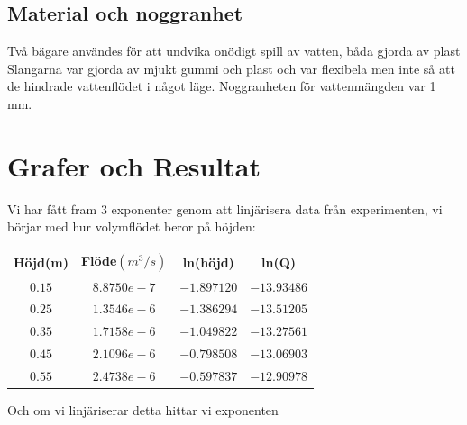 \documentclass[a4paper,12pt]{article}
\begin{document}
\subsection{Material och noggranhet}
    Två bägare användes för att undvika onödigt spill av vatten, båda gjorda av plast Slangarna var gjorda av mjukt gummi och plast och var flexibela men inte så att de hindrade vattenflödet i något läge. Noggranheten för vattenmängden var 1 mm.
%
\section{Grafer och Resultat}
Vi har fått fram 3 exponenter genom att linjärisera data från experimenten, vi
börjar med hur volymflödet beror på höjden: \\
\begin{center}
    \begin{tabular}{  c  c  c  c  }
        Höjd(m) & Flöde$(m^3/s)$ & ln(höjd) & ln(Q) \\ 
        \hline
        $0.15$ & $8.8750e-7$ & $-1.897120$ & $-13.93486$ \\
        $0.25$ & $1.3546e-6$ & $-1.386294$ & $-13.51205$ \\
        $0.35$ & $1.7158e-6$ & $-1.049822$ & $-13.27561$ \\
        $0.45$ & $2.1096e-6$ & $-0.798508$ & $-13.06903$ \\
        $0.55$ & $2.4738e-6$ & $-0.597837$ & $-12.90978$ \\
    \end{tabular}
\end{center}
Och om vi linjäriserar detta hittar vi exponenten \\
\end{document}
